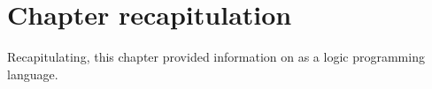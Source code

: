 \documentclass[thesis-solanki.tex]{subfiles}
\begin{document}
\section{Chapter recapitulation}
Recapitulating, this chapter provided information on  as a logic programming language.

\ifMain\ifDraft
\begin{scope}
  \nolinenumbers
  \enotesize
  \par
  \begin{singlespace}
  \setlength{\parskip}{12pt plus 2pt minus 1pt}
  \theendnotes
  \par
  \end{singlespace}
\end{scope}
\fi\fi
\end{document}
